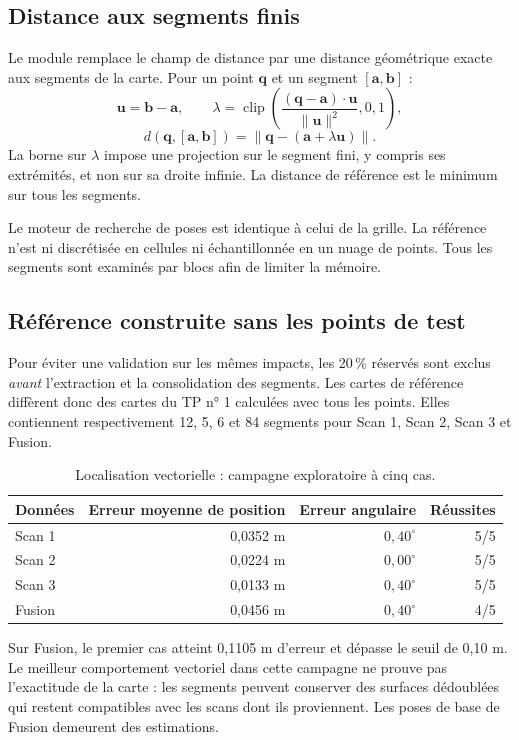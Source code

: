 \documentclass[11pt,a4paper]{article}
\newcommand{\code}[1]{\texttt{\detokenize{#1}}}
\begin{document}
\subsection{Distance aux segments finis}
Le module \code{localisation_vectorielle.py} remplace le champ de distance
par une distance géométrique exacte aux segments de la carte. Pour un point
$\mathbf q$ et un segment $[\mathbf a,\mathbf b]$ :
\[
 \mathbf u=\mathbf b-\mathbf a,\qquad
 \lambda=\operatorname{clip}\left(
 \frac{(\mathbf q-\mathbf a)\cdot\mathbf u}{\|\mathbf u\|^2},0,1\right),
\]
\[
 d(\mathbf q,[\mathbf a,\mathbf b])
 =\|\mathbf q-(\mathbf a+\lambda\mathbf u)\|.
\]
La borne sur $\lambda$ impose une projection sur le segment fini, y compris
ses extrémités, et non sur sa droite infinie. La distance de référence est
le minimum sur tous les segments.

Le moteur de recherche de poses est identique à celui de la grille.
La référence n'est ni discrétisée en cellules ni échantillonnée en un
nuage de points. Tous les segments sont examinés par blocs afin de limiter
la mémoire.

\subsection{Référence construite sans les points de test}
Pour éviter une validation sur les mêmes impacts, les 20\,\% réservés sont
exclus \emph{avant} l'extraction et la consolidation des segments.
Les cartes de référence diffèrent donc des cartes du TP n° 1 calculées
avec tous les points. Elles contiennent respectivement 12, 5, 6 et
84 segments pour Scan 1, Scan 2, Scan 3 et Fusion.

\begin{table}[h]
\centering
\caption{Localisation vectorielle : campagne exploratoire à cinq cas.}
\begin{tabular}{lrrr}
\toprule
Données & Erreur moyenne de position & Erreur angulaire & Réussites \\
\midrule
Scan 1 & 0,0352 m & $0,40^\circ$ & 5/5 \\
Scan 2 & 0,0224 m & $0,00^\circ$ & 5/5 \\
Scan 3 & 0,0133 m & $0,40^\circ$ & 5/5 \\
Fusion & 0,0456 m & $0,40^\circ$ & 4/5 \\
\bottomrule
\end{tabular}
\end{table}

Sur Fusion, le premier cas atteint 0,1105 m d'erreur et dépasse le seuil
de 0,10 m. Le meilleur comportement vectoriel dans cette campagne ne prouve
pas l'exactitude de la carte : les segments peuvent conserver des surfaces
dédoublées qui restent compatibles avec les scans dont ils proviennent.
Les poses de base de Fusion demeurent des estimations.
\end{document}
